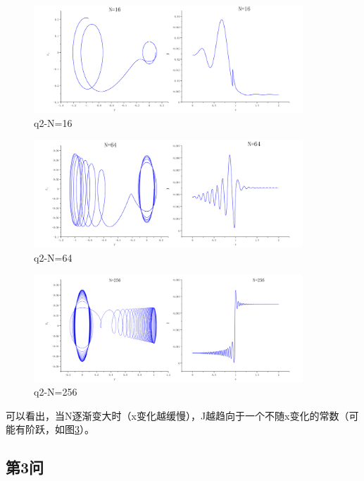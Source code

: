\documentclass[10pt, a4paper]{article}
\begin{document}
    \begin{figure}[H]
        \centering
        \includegraphics[width=0.9\textwidth]{q2-N=16.jpg}
        \caption{q2-N=16}\label{q2-N=16}
    \end{figure}

    \begin{figure}[H]
        \centering
        \includegraphics[width=0.9\textwidth]{q2-N=64.jpg}
        \caption{q2-N=64}\label{q2-N=64}
    \end{figure}

    \begin{figure}[H]
        \centering
        \includegraphics[width=0.9\textwidth]{q2-N=256.jpg}
        \caption{q2-N=256}\label{q2-N=256}
    \end{figure}

    可以看出，当N逐渐变大时（x变化越缓慢），J越趋向于一个不随x变化的常数（可能有阶跃，如图\ref{q2-N=256}）。

    
    \subsection{第3问}
\end{document}
